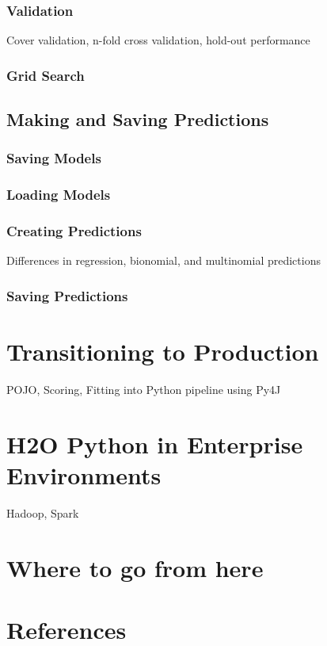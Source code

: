 \subsubsection{Validation}
Cover validation, n-fold cross validation, hold-out performance
\subsubsection{Grid Search}

\subsection{Making and Saving Predictions}
\subsubsection{Saving Models}
\subsubsection{Loading Models}
\subsubsection{Creating Predictions}
Differences in regression, bionomial, and multinomial predictions
\subsubsection{Saving Predictions}


\section{Transitioning to Production}
POJO, Scoring, Fitting into Python pipeline using Py4J


\section{H2O Python in Enterprise Environments}
Hadoop, Spark

\section{Where to go from here}


\newpage
\section{References}







\enddocument